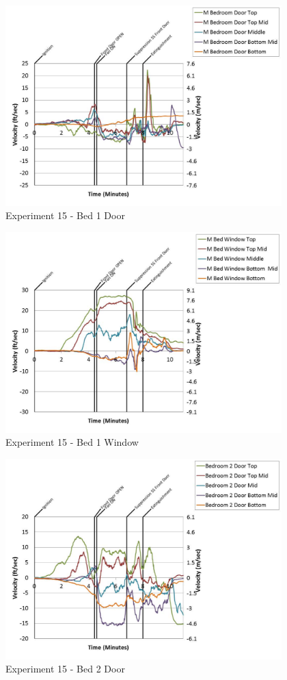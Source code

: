 \documentclass{article}
\begin{document}
\begin{appendices}
	\clearpage

	\begin{figure}[h!]
		\centering
		\includegraphics[height=3.05in]{0_Images/Results_Charts/Exp_15_Charts/Bed1Door.pdf}
		\caption{Experiment 15 - Bed 1 Door}
	\end{figure}
 

	\begin{figure}[h!]
		\centering
		\includegraphics[height=3.05in]{0_Images/Results_Charts/Exp_15_Charts/Bed1Window.pdf}
		\caption{Experiment 15 - Bed 1 Window}
	\end{figure}
 
	\clearpage

	\begin{figure}[h!]
		\centering
		\includegraphics[height=3.05in]{0_Images/Results_Charts/Exp_15_Charts/Bed2Door.pdf}
		\caption{Experiment 15 - Bed 2 Door}
	\end{figure}
 


\end{appendices}
\end{document}
